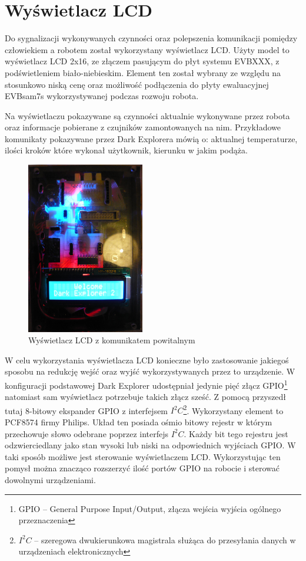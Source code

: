 \section{Wyświetlacz LCD}
\label{sec:lcd}
Do sygnalizacji wykonywanych czynności oraz polepszenia komunikacji pomiędzy
człowiekiem a robotem został wykorzystany wyświetlacz LCD. Użyty model to
wyświetlacz LCD 2x16, ze złączem pasującym do płyt systemu EVBXXX, z
podświetleniem biało-niebieskim. Element ten został wybrany ze względu na
stosunkowo niską cenę oraz możliwość podłączenia do płyty ewaluacyjnej EVBsam7s
wykorzystywanej podczas rozwoju robota.

Na wyświetlaczu pokazywane są czynności aktualnie wykonywane przez robota oraz
informacje pobierane z czujników zamontowanych na nim. Przykładowe komunikaty
pokazywane przez Dark Explorera mówią o: aktualnej temperaturze, ilości kroków
które wykonał użytkownik, kierunku w jakim podąża.

\begin{figure}[!ht]
 \centering
 \includegraphics[height=75mm]{../images/ch04/lcd_welcome.jpg}
 \caption{Wyświetlacz LCD z komunikatem powitalnym}
 \label{fig:LCD}
\end{figure}

W celu wykorzystania wyświetlacza LCD konieczne było zastosowanie jakiegoś
sposobu na redukcję wejść oraz wyjść wykorzystywanych przez to urządzenie. W
konfiguracji podstawowej Dark Explorer udostępniał jedynie pięć złącz
GPIO\footnote{GPIO -- General Purpose Input/Output, złącza wejścia wyjścia
ogólnego przeznaczenia} natomiast sam wyświetlacz potrzebuje takich złącz sześć.
Z pomocą przyszedł tutaj 8-bitowy ekspander GPIO z interfejsem
$I^{2}C$\footnote{$I^{2}C$ -- szeregowa dwukierunkowa magistrala służąca do
przesyłania danych w urządzeniach elektronicznych}. Wykorzystany element to
PCF8574 firmy Philips. Układ ten posiada ośmio bitowy rejestr w którym
przechowuje słowo odebrane poprzez interfejs $I^{2}C$. Każdy bit tego rejestru
jest odzwierciedlany jako stan wysoki lub niski na odpowiednich wyjściach GPIO. W
taki sposób możliwe jest sterowanie wyświetlaczem LCD. Wykorzystując ten pomysł
można znacząco rozszerzyć ilość portów GPIO na robocie i sterować dowolnymi
urządzeniami.

